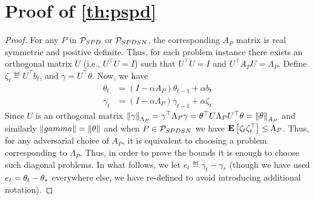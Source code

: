 \section{Proof of \cref{th:pspd}}
\label{sec:pspd}
\thpspd*
\begin{proof}
For any $P$ in $\P_{SPD}$ or $\P_{SPDSN}$, the corresponding $A_P$ matrix is real symmetric and positive definite. Thus, for each problem instance there exists an orthogonal matrix $U$ (i.e., $U^\top U=I$) such that $U^\top U=I$ and $U^\top A_P U=\Lambda_P$. Define $\zeta_t\eqdef U^\top b_t$, and $\gamma=U^\top \theta$. Now, we have
\begin{align}
\theta_t&=(I-\alpha A_P)\theta_{t-1}+\alpha b_t\\
\label{eq:gamrec}\gamma_t&=(I-\alpha \Lambda_P)\gamma_{t-1}+\alpha \zeta_t
\end{align}
Since $U$ is an orthogonal matrix $\norm{\gamma}_{\Lambda_P}=\gamma^\top \Lambda_P \gamma= \theta^\top U \Lambda_P U^\top \theta=\norm{\theta}_{A_P}$ and similarly $\norm{gamma}=\norm{\theta}$ and when $P\in \P_{SPDSN}$ we have $\EE{\zeta_t \zeta_t^\top}\leq \Lambda_P$. Thus, for any adversarial choice of $A_P$, it is equivalent to choosing a problem corresponding to $\Lambda_P$. Thus, in order to prove the bounds it is enough to choose such diagonal problems. In what follows, we let $e_t\eqdef\gamma_t-\gamma_*$ (though we have used $e_t=\theta_t-\ts$ everywhere else, we have re-defined to avoid introducing additional notation).


\end{proof}

